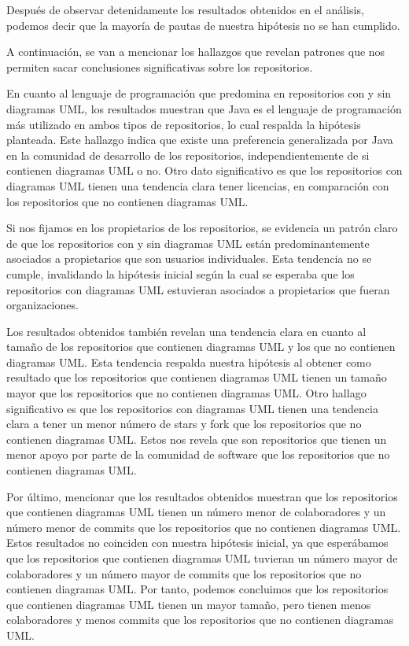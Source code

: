\documentclass[a4paper, 12pt]{book}
\begin{document}
Después de observar detenidamente los resultados obtenidos en el análisis, podemos decir que la mayoría de pautas de nuestra hipótesis no se han cumplido.


A continuación, se van a mencionar los hallazgos que revelan patrones que nos permiten sacar conclusiones significativas sobre los repositorios.

En cuanto al lenguaje de programación que predomina en repositorios con y sin diagramas UML, los resultados muestran que Java es el lenguaje de programación más utilizado en ambos tipos de repositorios, lo cual respalda la hipótesis planteada.
Este hallazgo indica que existe una preferencia generalizada por Java en la comunidad de desarrollo de los repositorios, independientemente de si contienen diagramas UML o no.
Otro dato significativo es que los repositorios con diagramas UML tienen una tendencia clara tener licencias, en comparación con los repositorios que no contienen diagramas UML.


Si nos fijamos en los propietarios de los repositorios, se evidencia un patrón claro de que los repositorios con y sin diagramas UML están predominantemente asociados a propietarios que son usuarios individuales.
Esta tendencia no se cumple, invalidando la hipótesis inicial según la cual se esperaba que los repositorios con diagramas UML estuvieran asociados a propietarios que fueran organizaciones.


Los resultados obtenidos también revelan una tendencia clara en cuanto al tamaño de los repositorios que contienen diagramas UML y los que no contienen diagramas UML.
Esta tendencia respalda nuestra hipótesis al obtener como resultado que los repositorios que contienen diagramas UML tienen un tamaño mayor que los repositorios que no contienen diagramas UML.
Otro hallago significativo es que los repositorios con diagramas UML tienen una tendencia clara a tener un menor número de stars y fork que los repositorios que no contienen diagramas UML.
Estos nos revela que son repositorios que tienen un menor apoyo por parte de la comunidad de software que los repositorios que no contienen diagramas UML.


Por último, mencionar que los resultados obtenidos muestran que los repositorios que contienen diagramas UML tienen un número menor de colaboradores y un número menor de commits que los repositorios que no contienen diagramas UML.
Estos resultados no coinciden con nuestra hipótesis inicial, ya que esperábamos que los repositorios que contienen diagramas UML tuvieran un número mayor de colaboradores y un número mayor de commits que los repositorios que no contienen diagramas UML.
Por tanto, podemos concluimos que los repositorios que contienen diagramas UML tienen un mayor tamaño, pero tienen menos colaboradores y menos commits que los repositorios que no contienen diagramas UML.
\end{document}

